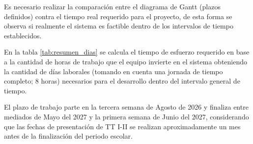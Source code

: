 Es necesario realizar la comparación entre el diagrama de Gantt (plazos definidos) contra el tiempo real requerido para el proyecto, de esta forma se observa si realmente el sistema es factible dentro de los intervalos de tiempo establecidos.

En la tabla \ref{tab:resumen_dias} se calcula el tiempo de esfuerzo requerido en base a la cantidad de horas de trabajo que el equipo invierte en el sistema obteniendo la cantidad de días laborales (tomando en cuenta una jornada de tiempo completo; 8 horas) necesarios para el desarrollo dentro del intervalo general de tiempo. 

El plazo de trabajo parte en la tercera semana de Agosto de 2026 y finaliza entre mediados de Mayo del 2027 y la primera semana de Junio del 2027, considerando que las fechas de presentación de TT I-II se realizan aproximadamente un mes antes de la finalización del periodo escolar. 
